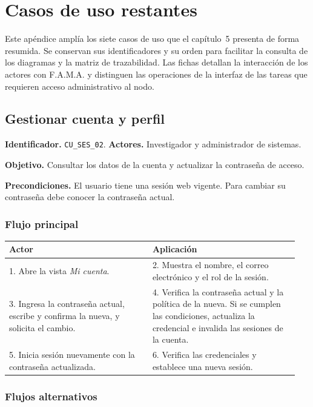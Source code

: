 \chapter{Casos de uso restantes}
\label{ap:casos-de-uso-restantes}

Este apéndice amplía los siete casos de uso que el capítulo~5 presenta
de forma resumida. Se conservan sus identificadores y su orden para
facilitar la consulta de los diagramas y la matriz de trazabilidad.
Las fichas detallan la interacción de los actores con F.A.M.A. y
distinguen las operaciones de la interfaz de las tareas que requieren
acceso administrativo al nodo.

\section{Gestionar cuenta y perfil}
\label{cu:ses-02}

\noindent\textbf{Identificador.} \texttt{CU\_SES\_02}.
\textbf{Actores.} Investigador y administrador de sistemas.

\noindent\textbf{Objetivo.} Consultar los datos de la cuenta y actualizar
la contraseña de acceso.

\noindent\textbf{Precondiciones.} El usuario tiene una sesión web vigente.
Para cambiar su contraseña debe conocer la contraseña actual.

\subsection*{Flujo principal}

\noindent
\begin{tabular}{@{}p{0.47\linewidth}p{0.48\linewidth}@{}}
    \hline
    \textbf{Actor} & \textbf{Aplicación} \\
    \hline
    1. Abre la vista \emph{Mi cuenta}. &
    2. Muestra el nombre, el correo electrónico y el rol de la sesión. \\
    3. Ingresa la contraseña actual, escribe y confirma la nueva, y solicita el cambio. &
    4. Verifica la contraseña actual y la política de la nueva. Si se cumplen las condiciones, actualiza la credencial e invalida las sesiones de la cuenta. \\
    5. Inicia sesión nuevamente con la contraseña actualizada. &
    6. Verifica las credenciales y establece una nueva sesión. \\
    \hline
\end{tabular}

\subsection*{Flujos alternativos}

